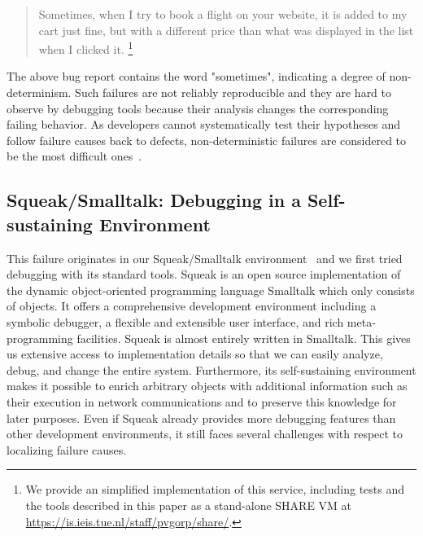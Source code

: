 \documentclass[preprint,3p]{elsarticle}
\begin{document}
\begin{quote}
\label{quote:bugreport}
Sometimes, when I try to book a flight on your website, it is added to
my cart just fine, but with a different price than what was displayed
in the list when I clicked it.%
\footnote{We provide an simplified implementation of this service,
  including tests and the tools described in this paper as a
  stand-alone \textsc{SHARE}\cite{van2011share} \textsc{VM} at
  \url{https://is.ieis.tue.nl/staff/pvgorp/share/}.}
\end{quote}

The above bug report contains the word "sometimes", indicating a degree of non-determinism. 
Such failures are not reliably reproducible and they are hard to observe by debugging tools because their analysis changes the corresponding failing behavior.
As developers cannot systematically test their hypotheses and follow failure causes back to defects, non-deterministic  failures are considered to be the most difficult ones~\cite{zeller2009programs}.





\subsection{Squeak/Smalltalk: Debugging in a Self-sustaining Environment}

This failure originates in our Squeak/Smalltalk environment~\cite{Ingalls1997} and we first tried debugging with its standard tools. 
Squeak is an open source implementation of the dynamic object-oriented programming language Smalltalk which only consists of objects.
It offers a comprehensive development environment including a symbolic debugger, a flexible and extensible user interface, and rich meta-programming facilities. 
Squeak is almost entirely written in Smalltalk. This gives us extensive access to implementation details so that we can easily analyze, debug, and change the entire system. 
Furthermore, its self-sustaining environment makes it possible to enrich arbitrary objects with additional information such as their execution in network communications and to preserve this knowledge for later purposes. 
Even if Squeak already provides more debugging features than other development environments, it still faces several challenges with respect to localizing failure causes. 
\end{document}
